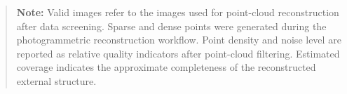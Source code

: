 \begin{quote}
\textbf{Note:} Valid images refer to the images used for point-cloud
reconstruction after data screening. Sparse and dense points were
generated during the photogrammetric reconstruction workflow. Point
density and noise level are reported as relative quality indicators
after point-cloud filtering. Estimated coverage indicates the
approximate completeness of the reconstructed external structure.
\end{quote}
